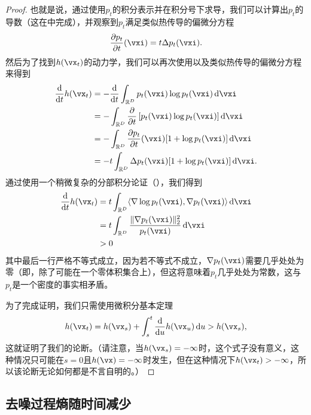 \documentclass[../../book-main.tex]{subfiles}
\begin{document}
\begin{proof}
    也就是说，通过使用\(p_{t}\)的积分表示并在积分号下求导，我们可以计算出\(p_{t}\)的导数（这在中完成），并观察到\(p_{t}\)满足类似热传导的偏微分方程
    \begin{equation}
        \pdv{p_{t}}{t}(\vxi) = t\Delta p_{t}(\vxi).
    \end{equation}
    然后为了找到\(h(\vx_{t})\)的动力学，我们可以再次使用以及类似热传导的偏微分方程来得到
    \begin{align}
        \odv*{h(\vx_{t})}{t}
        &= -\odv*{\int_{\R^{D}}p_{t}(\vxi)\log p_{t}(\vxi)\odif{\vxi}}{t} \\
        &= -\int_{\R^{D}}\pdv*{\bs{p_{t}(\vxi)\log p_{t}(\vxi)}}{t}\odif{\vxi} \\
        &= -\int_{\R^{D}}\pdv{p_{t}}{t}(\vxi)[1 + \log p_{t}(\vxi)]\odif{\vxi} \\
        &= -t\int_{\R^{D}}\Delta p_{t}(\vxi)[1 + \log p_{t}(\vxi)]\odif{\vxi}.
    \end{align}
    通过使用一个稍微复杂的分部积分论证（），我们得到
    \begin{align}
        \odv*{h(\vx_{t})}{t}
        &= t\int_{\R^{D}}\ip{\nabla \log p_{t}(\vxi)}{\nabla p_{t}(\vxi)}\odif{\vxi} \\
        &= t\int_{\R^{D}}\frac{\norm{\nabla p_{t}(\vxi)}_{2}^{2}}{p_{t}(\vxi)}\odif{\vxi} \\
        &> 0
    \end{align}
    其中最后一行严格不等式成立，因为若不等式不成立，\(\nabla p_{t}(\vxi)\)需要几乎处处为零（即，除了可能在一个零体积集合上），但这将意味着\(p_{t}\)几乎处处为常数，这与\(p_{t}\)是一个密度的事实相矛盾。

    为了完成证明，我们只需使用微积分基本定理
    \begin{equation}
        h(\vx_{t}) = h(\vx_{s}) + \int_{s}^{t}\odv*{h(\vx_{u})}{u}\odif{u} > h(\vx_{s}),
    \end{equation}
    这就证明了我们的论断。（请注意，当\(h(\vx_{s}) = -\infty\)时，这个式子没有意义，这种情况只可能在\(s=0\)且\(h(\vx)=-\infty\)时发生，但在这种情况下\(h(\vx_{t}) > -\infty\)，所以该论断无论如何都是不言自明的。）
\end{proof}

\subsection{去噪过程熵随时间减少}\label{sub:denoising_entropy_decreases}
\end{document}
